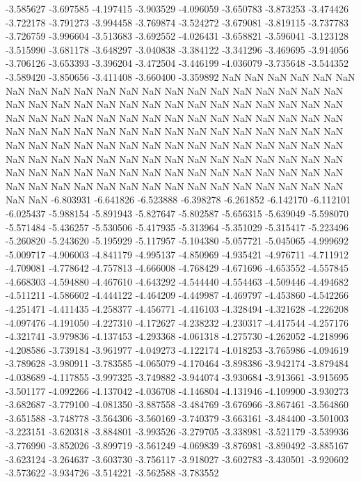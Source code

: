 -3.585627
-3.697585
-4.197415
-3.903529
-4.096059
-3.650783
-3.873253
-3.474426
-3.722178
-3.791273
-3.994458
-3.769874
-3.524272
-3.679081
-3.819115
-3.737783
-3.726759
-3.996604
-3.513683
-3.692552
-4.026431
-3.658821
-3.596041
-3.123128
-3.515990
-3.681178
-3.648297
-3.040838
-3.384122
-3.341296
-3.469695
-3.914056
-3.706126
-3.653393
-3.396204
-3.472504
-3.446199
-4.036079
-3.735648
-3.544352
-3.589420
-3.850656
-3.411408
-3.660400
-3.359892
NaN
NaN
NaN
NaN
NaN
NaN
NaN
NaN
NaN
NaN
NaN
NaN
NaN
NaN
NaN
NaN
NaN
NaN
NaN
NaN
NaN
NaN
NaN
NaN
NaN
NaN
NaN
NaN
NaN
NaN
NaN
NaN
NaN
NaN
NaN
NaN
NaN
NaN
NaN
NaN
NaN
NaN
NaN
NaN
NaN
NaN
NaN
NaN
NaN
NaN
NaN
NaN
NaN
NaN
NaN
NaN
NaN
NaN
NaN
NaN
NaN
NaN
NaN
NaN
NaN
NaN
NaN
NaN
NaN
NaN
NaN
NaN
NaN
NaN
NaN
NaN
NaN
NaN
NaN
NaN
NaN
NaN
NaN
NaN
NaN
NaN
NaN
NaN
NaN
NaN
NaN
NaN
NaN
NaN
NaN
NaN
NaN
NaN
NaN
NaN
NaN
NaN
NaN
NaN
NaN
NaN
NaN
NaN
NaN
NaN
NaN
NaN
NaN
NaN
NaN
NaN
NaN
NaN
NaN
NaN
NaN
NaN
NaN
NaN
NaN
NaN
NaN
NaN
-6.803931
-6.641826
-6.523888
-6.398278
-6.261852
-6.142170
-6.112101
-6.025437
-5.988154
-5.891943
-5.827647
-5.802587
-5.656315
-5.639049
-5.598070
-5.571484
-5.436257
-5.530506
-5.417935
-5.313964
-5.351029
-5.315417
-5.223496
-5.260820
-5.243620
-5.195929
-5.117957
-5.104380
-5.057721
-5.045065
-4.999692
-5.009717
-4.906003
-4.841179
-4.995137
-4.850969
-4.935421
-4.976711
-4.711912
-4.709081
-4.778642
-4.757813
-4.666008
-4.768429
-4.671696
-4.653552
-4.557845
-4.668303
-4.594880
-4.467610
-4.643292
-4.544440
-4.554463
-4.509446
-4.494682
-4.511211
-4.586602
-4.444122
-4.464209
-4.449987
-4.469797
-4.453860
-4.542266
-4.251471
-4.411435
-4.258377
-4.456771
-4.416103
-4.328494
-4.321628
-4.226208
-4.097476
-4.191050
-4.227310
-4.172627
-4.238232
-4.230317
-4.417544
-4.257176
-4.321741
-3.979836
-4.137453
-4.293368
-4.061318
-4.275730
-4.262052
-4.218996
-4.208586
-3.739184
-3.961977
-4.049273
-4.122174
-4.018253
-3.765986
-4.094619
-3.789628
-3.980911
-3.783585
-4.065079
-4.170464
-3.898386
-3.942174
-3.879484
-4.038689
-4.117855
-3.997325
-3.749882
-3.944074
-3.930684
-3.913661
-3.915695
-3.501177
-4.092266
-4.137042
-4.036708
-4.146804
-4.131946
-4.109900
-3.930273
-3.682687
-3.779100
-4.081350
-3.887558
-3.484769
-3.676966
-3.867461
-3.564860
-3.651588
-3.748778
-3.564306
-3.560169
-3.740379
-3.663161
-3.484400
-3.501003
-3.223151
-3.620318
-3.884801
-3.993526
-3.279705
-3.338981
-3.521179
-3.539936
-3.776990
-3.852026
-3.899719
-3.561249
-4.069839
-3.876981
-3.890492
-3.885167
-3.623124
-3.264637
-3.603730
-3.756117
-3.918027
-3.602783
-3.430501
-3.920602
-3.573622
-3.934726
-3.514221
-3.562588
-3.783552
